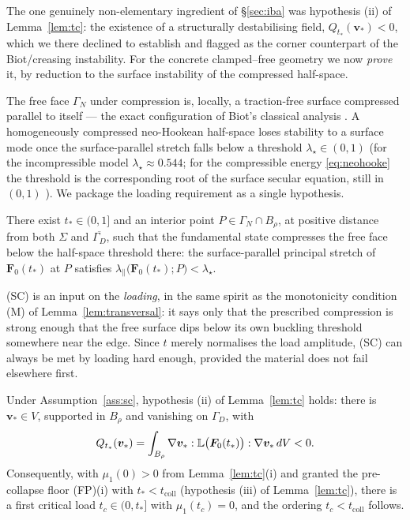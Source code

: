 The one genuinely non-elementary ingredient of \S\ref{sec:iba} was hypothesis (ii) of Lemma~\ref{lem:tc}: the existence
of a structurally destabilising field, $Q_{t_*}(\bm{v}_*)<0$, which we there declined to establish and flagged as the
corner counterpart of the Biot/creasing instability. For the concrete clamped--free geometry we now \emph{prove} it, by
reduction to the surface instability of the compressed half-space.

The free face $\Gamma_N$ under compression is, locally, a traction-free surface compressed parallel to itself --- the
exact configuration of Biot's classical analysis \cite{Biot1963}. A homogeneously compressed neo-Hookean half-space
loses stability to a surface mode once the surface-parallel stretch falls below a threshold $\lambda_\star\in(0,1)$
(for the incompressible model $\lambda_\star\approx0.544$; for the compressible energy \eqref{eq:neohooke} the
threshold is the corresponding root of the surface secular equation, still in $(0,1)$ \cite{Hong2009}). We package the
loading requirement as a single hypothesis.

\begin{assumption}
    \label{ass:sc}
    There exist $t_*\in(0,1]$ and an interior point $P\in\Gamma_N\cap B_\rho$, at positive distance from both $\Sigma$
    and $\overline{\Gamma_D}$, such that the fundamental state compresses the free face below the half-space threshold
    there: the surface-parallel principal stretch of $\bm{F}_0(t_*)$ at $P$ satisfies
    $\lambda_\parallel\big(\bm{F}_0(t_*);P\big)<\lambda_\star$.
\end{assumption}

\noindent (SC) is an input on the \emph{loading}, in the same spirit as the monotonicity condition (M) of
Lemma~\ref{lem:transversal}: it says only that the prescribed compression is strong enough that the free surface dips
below its own buckling threshold somewhere near the edge. Since $t$ merely normalises the load amplitude, (SC) can
always be met by loading hard enough, provided the material does not fail elsewhere first.

\begin{lemma}
    \label{lem:biot}
    Under Assumption~\ref{ass:sc}, hypothesis (ii) of Lemma~\ref{lem:tc} holds: there is $\bm{v}_*\in V$, supported in
    $B_\rho$ and vanishing on $\Gamma_D$, with
    \begin{equation}
        \label{eq:Qneg}
        Q_{t_*}(\bm{v}_*) = \int_{B_\rho}\nabla\bm{v}_* : \mathbb{L}\big(\bm{F}_0(t_*)\big) : \nabla\bm{v}_*\,dV < 0 .
    \end{equation}
    Consequently, with $\mu_1(0)>0$ from Lemma~\ref{lem:tc}(i) and granted the pre-collapse floor (FP)(i) with
    $t_*<t_{\mathrm{coll}}$ (hypothesis (iii) of Lemma~\ref{lem:tc}), there is a first critical load $t_c\in(0,t_*]$
    with $\mu_1(t_c)=0$, and the ordering $t_c<t_{\mathrm{coll}}$ follows.
\end{lemma}

